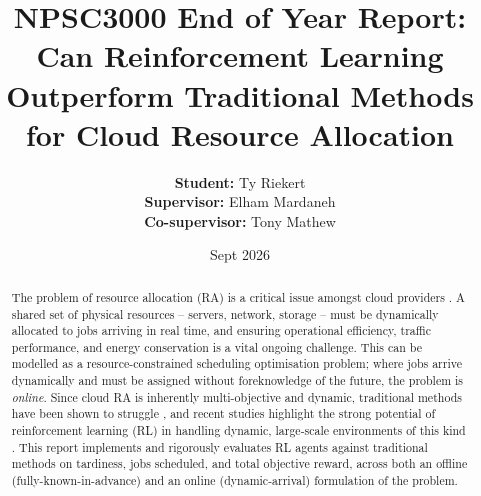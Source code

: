 \documentclass[12pt]{article}
\title{NPSC3000 End of Year Report: Can Reinforcement Learning Outperform Traditional Methods for Cloud Resource Allocation}
\author{
\textbf{Student:} Ty Riekert \\
\textbf{Supervisor:} Elham Mardaneh \\
\textbf{Co-supervisor:} Tony Mathew
}
\date{Sept 2026}
\begin{document}
\maketitle
\begin{abstract}
The problem of resource allocation (RA) is a critical issue amongst cloud providers \cite{saidi2023, sdn2021, vinothina2012, parikh2013, mohamaddiah2014}. A shared set of physical resources -- servers, network, storage -- must be dynamically allocated to jobs arriving in real time, and ensuring operational efficiency, traffic performance, and energy conservation is a vital ongoing challenge. This can be modelled as a resource-constrained scheduling optimisation problem; where jobs arrive dynamically and must be assigned without foreknowledge of the future, the problem is \textit{online}. Since cloud RA is inherently multi-objective and dynamic, traditional methods have been shown to struggle \cite{lbts2024, 10854610, DAHMANI2025100616, hu2021attend2pack}, and recent studies highlight the strong potential of reinforcement learning (RL) in handling dynamic, large-scale environments of this kind \cite{saidi2023, autoscaling2023, lbts2024, dynamic2026}. This report implements and rigorously evaluates RL agents against traditional methods on tardiness, jobs scheduled, and total objective reward, across both an offline (fully-known-in-advance) and an online (dynamic-arrival) formulation of the problem.


\end{abstract}
\end{document}
